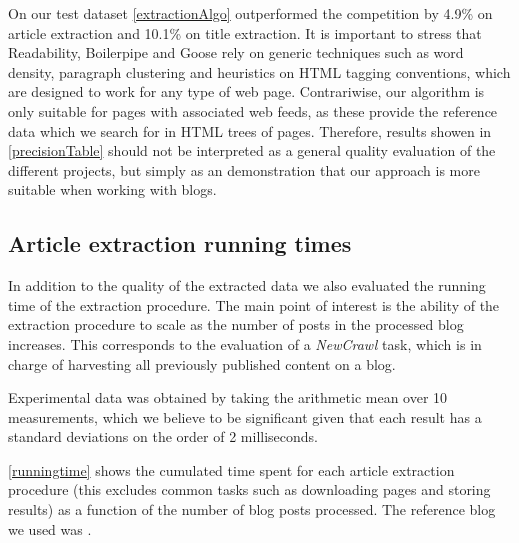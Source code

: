 \precisionTable

On our test dataset \autoref{extractionAlgo} outperformed the competition by 4.9\% on article extraction and 10.1\% on title extraction. It is important to stress that Readability, Boilerpipe and Goose rely on generic techniques such as word density, paragraph clustering and heuristics on HTML tagging conventions, which are designed to work for any type of web page. Contrariwise, our algorithm is only suitable for pages with associated web feeds, as these provide the reference data which we search for in HTML trees of pages. Therefore, results showen in \autoref{precisionTable} should not be interpreted as a general quality evaluation of the different projects, but simply as an demonstration that our approach is more suitable when working with blogs.


\subsection{Article extraction running times}

In addition to the quality of the extracted data we also evaluated the running time of the extraction procedure. The main point of interest is the ability of the extraction procedure to scale as the number of posts in the processed blog increases. This corresponds to the evaluation of a \emph{NewCrawl} task, which is in charge of harvesting all previously published content on a blog.

Experimental data was obtained by taking the arithmetic mean over 10 measurements, which we believe to be significant given that each result has a standard deviations on the order of 2 milliseconds. 

\autoref{runningtime} shows the cumulated time spent for each article extraction procedure (this excludes common tasks such as downloading pages and storing results) as a function of the number of blog posts processed. The reference blog we used was .

